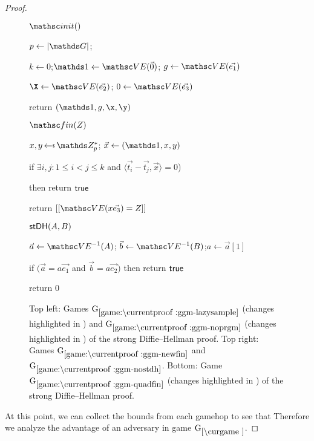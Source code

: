\begin{proof}
\begin{figure}[tp]
\begin{minipage}[t]{0.49\textwidth}
		\ExptSepSpace
		\begin{oracle}{$\Initialize()$}
			\item $p \gets |\group|$;
			\item $k\gets 0$;$\one \gets \VE(\vec{0})$; $\generator\gets \VE(\vec{e_1})$
			\item $\X \gets \VE(\vec{e_2})$; $\Y\gets \VE(\vec{e_3})$
			\item return $(\one,\generator,\x,\y)$
		\end{oracle}
		\ExptSepSpace
		\begin{oracle}{$\Finalize(Z)$}
			\item $x,y \getsr \ZZ_p^*$; $\vec{x} \gets (\one, x, y)$
			\item if $\exists i,j : 1 \leq i < j \leq k$ and $\langle \vec{t_i}-\vec{t_j},\vec{x} \rangle = 0$)
			\item \quad then return $\mathsf{true}$
			\item {}
			\item[] 
			\item \quad {}
			\item return $[[\VE(x \vec{e_3}) = Z]]$ 
		\end{oracle}
	\end{minipage}
	\begin{minipage}[t]{0.49\textwidth}
		\ExptSepSpace
		
		\begin{oracle}{$\mathsf{stDH}(A,B)$}
			\item $\vec{a} \gets \VE^{-1}(A)$; $\vec{b} \gets \VE^{-1}(B)$;$a \gets \vec{a}[1]$
			\item if $( \vec{a} =a\vec{e_1}$ and $\vec{b} = a \vec{e_2})$ then return $\mathsf{true}$
			\item return $0$
		\end{oracle}
		
		
	\end{minipage}
	
	\caption[]{%
		Top left: Games $\lblGm{ggm-lazysample}$ (changes highlighted in ) and $\lblGm{ggm-noprgm}$ (changes highlighted in ) of the strong Diffie--Hellman proof. Top right: Games $\lblGm{ggm-newfin}$ and $\lblGm{ggm-nostdh}$. Bottom: Game $\lblGm{ggm-quadfin}$ (changes highlighted in ) of the strong Diffie--Hellman proof.
	}
	\label{fig:GGM-proof:game:lazysample}
	\label{fig:GGM-proof:game:quadfin}
\end{figure}
At this point, we can collect the bounds from each gamehop to see that
Therefore we analyze the advantage of an adversary in game $\curGm*$.
  

\end{proof}

